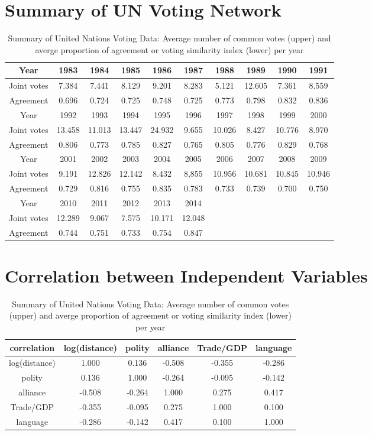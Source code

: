 \documentclass[a4paper]{article}
\begin{document}
\begin{appendices}
\section{Summary of UN Voting Network}\label{appendix: summarystat}
\begin{table}[ht]
	\centering
	\begin{tabular}{ |c|c|c|c|c|c|c|c|c|c|} 
		\hline
		{Year}	& 1983 & 1984& 1985& 1986 & 1987& 1988& 1989&1990&1991\\ \hline
		Joint votes & 7.384&7.441&8.129&9.201&8.283&5.121&12.605&7.361&8.559\\\hline
		Agreement & 0.696& 0.724& 0.725 & 0.748& 0.725& 0.773 & 0.798& 0.832& 0.836\\\hline\hline 
		{Year}	& 1992&1993& 1994 & 1995& 1996& 1997 & 1998& 1999& 2000\\ \hline
		Joint votes  &13.458&11.013&13.447&24.932&9.655&10.026&8.427&10.776&8.970\\\hline
		Agreement & 0.806&0.773& 0.785& 0.827& 0.765& 0.805& 0.776& 0.829 & 0.768\\\hline\hline
		{Year}	&2001&2002&2003&2004&2005& 2006& 2007& 2008&  2009\\ \hline
		Joint votes &9.191&12.826&12.142&8.432&8,855&10.956&10.681&10.845&10.946\\\hline
		Agreement &0.729& 0.816& 0.755& 0.835& 0.783& 0.733& 0.739&0.700&0.750\\
		\hline\hline
		Year & 2010& 2011&2012&2013&2014&&&&\\\hline
		Joint votes&12.289&9.067&7.575&10.171&12.048&&&&\\\hline
		Agreement&  0.744& 0.751& 0.733&0.754&0.847&&&&\\\hline
	\end{tabular}
	\caption {Summary of United Nations Voting Data: Average number of common votes (upper) and averge proportion of agreement or voting similarity index (lower) per year}
	\label{table:EDA}
\end{table}
\section{Correlation between Independent Variables}\label{appendix: correlations}
\begin{table}[ht]
	\centering
	\begin{tabular}{ |c|ccccc|} 
		\hline
	correlation & 	log(distance) & polity &   alliance &  Trade/GDP  &  language\\
	 \hline
			log(distance)& 1.000& 0.136&  -0.508&-0.355&-0.286\\
			polity&0.136&1.000& -0.264&-0.095&-0.142\\
			alliance& -0.508&-0.264&1.000&0.275& 0.417\\
			Trade/GDP&  -0.355& -0.095& 0.275& 1.000& 0.100\\
			language& -0.286&-0.142& 0.417& 0.100& 1.000\\
					\hline
	\end{tabular}
	\caption {Summary of United Nations Voting Data: Average number of common votes (upper) and averge proportion of agreement or voting similarity index (lower) per year}
	\label{table:correlation}
\end{table}

\end{appendices}
\end{document}
